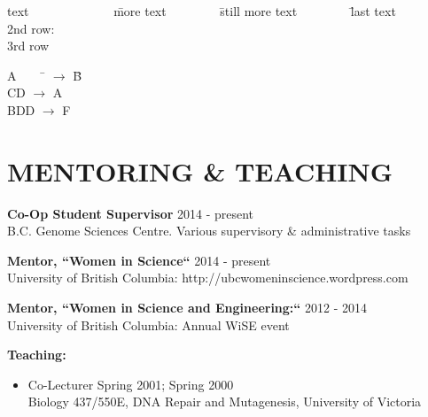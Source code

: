 \documentclass[margin]{res} %
\begin{document}
\begin{resume}
\begin{tabbing}
text ~~~~~~~~~~~~~\= more text ~~~~~~~~\= still more text ~~~~~~~~\= last text \\
2nd row:        \\
3rd row \>   \\
\end{tabbing}

\begin{tabbing}
A~~~~ \= $\to$ \= B \\
CD \> $\to$ \> A \\
BDD \> $\to$ \> F \\
\end{tabbing}
\fi


{\color{blue}\section{MENTORING \& TEACHING}}

\textbf{Co-Op Student Supervisor} \hfill 2014 - present\vspace{0.05 cm}\\
B.C. Genome Sciences Centre. Various supervisory \& administrative tasks

\textbf{Mentor, ``Women in Science``} \hfill 2014 - present\vspace{0.05 cm}\\
University of British Columbia: http://ubcwomeninscience.wordpress.com

\textbf{Mentor, ``Women in Science and Engineering:``} \hfill 2012 - 2014\vspace{0.05 cm}\\
University of British Columbia: Annual WiSE event

\textbf{Teaching:}

\begin{itemize} \itemsep -2pt %
\item Co-Lecturer \hfill Spring 2001; Spring 2000\\
Biology 437/550E, DNA Repair and Mutagenesis, University of Victoria


\end{itemize}
\end{resume}
\end{document}
